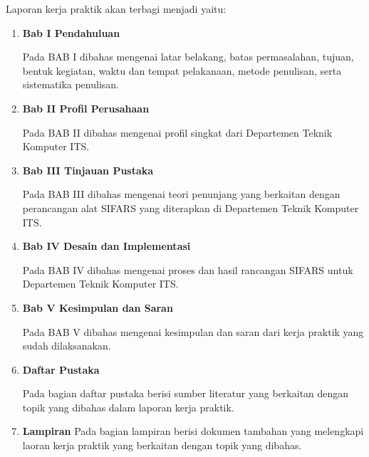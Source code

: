 Laporan kerja praktik akan terbagi menjadi yaitu:

\begin{enumerate}[nolistsep]

  \item \textbf{Bab I Pendahuluan}

  Pada BAB I dibahas mengenai latar belakang, batas permasalahan, tujuan, bentuk kegiatan, waktu dan tempat pelakanaan, metode penulisan, serta sistematika penulisan.

  \item \textbf{Bab II Profil Perusahaan}

  Pada BAB II dibahas mengenai profil singkat dari Departemen Teknik Komputer ITS.

  \item \textbf{Bab III Tinjauan Pustaka}

  Pada BAB III dibahas mengenai teori penunjang yang berkaitan dengan perancangan alat SIFARS yang diterapkan di Departemen Teknik Komputer ITS.

  \item \textbf{Bab IV Desain dan Implementasi}

  Pada BAB IV dibahas mengenai proses dan hasil rancangan SIFARS untuk Departemen Teknik Komputer ITS.

  \item \textbf{Bab V Kesimpulan dan Saran}

  Pada BAB V dibahas mengenai kesimpulan dan saran dari kerja praktik yang sudah dilaksanakan.

  \item \textbf{Daftar Pustaka}

  Pada bagian daftar pustaka berisi sumber literatur yang berkaitan dengan topik yang dibahas dalam laporan kerja praktik.
  
   \item \textbf{Lampiran}
   Pada bagian lampiran berisi dokumen tambahan yang melengkapi laoran kerja praktik yang berkaitan dengan topik yang dibahas.



\end{enumerate}
